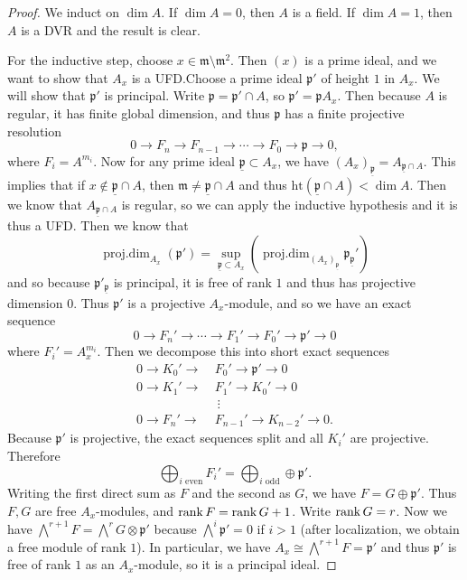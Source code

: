 \documentclass[leqno, openany]{memoir}
\theoremstyle{definition}
\theoremstyle{remark}
\theoremstyle{plain}
\theoremstyle{definition}
\theoremstyle{remark}
\newcommand{\mf}[1]{\mathfrak{#1}}
\newcommand{\mr}[1]{\mathrm{#1}}
\newcommand{\ul}[1]{\underline{#1}}
\DeclareMathOperator{\pdim}{proj.dim}
\begin{document}
\begin{proof} We induct on $\dim A$. If $\dim A = 0$, then $A$ is a field. If
    $\dim A = 1$, then $A$ is a DVR and the result is clear.

    For the inductive step, choose $x \in \mf{m} \setminus \mf{m}^2$. Then
    $(x)$ is a prime ideal, and we want to show that $A_x$ is a UFD.\@ Choose a
    prime ideal $\mf{p}'$ of height $1$ in $A_x$. We will show that $\mf{p}'$
    is principal. Write $\mf{p} = \mf{p}' \cap A$, so $\mf{p}' = \mf{p} A_x$.
    Then because $A$ is regular, it has finite global dimension, and thus
    $\mf{p}$ has a finite projective resolution \[ 0 \to F_n \to F_{n-1} \to
    \cdots \to F_0 \to \mf{p} \to 0, \] where $F_i = A^{m_i}$. Now for any
    prime ideal $\ul{\mf{p}} \subset A_x$, we have ${(A_x)}_{\ul{\mf{p}}} =
    A_{\ul{\mf{p}} \cap A}$. This implies that if $x \notin \ul{\mf{p}} \cap
    A$, then $\mf{m} \neq \ul{\mf{p}} \cap A$ and thus $\mr{ht}(\ul{\mf{p}}
    \cap A) < \dim A$. Then we know that $A_{\ul{\mf{p}} \cap A}$ is regular,
    so we can apply the inductive hypothesis and it is thus a UFD. Then we know
    that \[ \pdim_{A_x}(\mf{p}') = \sup_{\ul{\mf{p}} \subset A_x}
    (\pdim_{{(A_x)}_{\ul{\mf{p}}}} \mf{p}_{\ul{\mf{p}}}') \] and so because
    $\mf{p}'_{\ul{\mf{p}}}$ is principal, it is free of rank $1$ and thus has
    projective dimension $0$. Thus $\mf{p}'$ is a projective $A_x$-module, and
    so we have an exact sequence \[ 0 \to F_n' \to  \cdots \to F_1' \to F_0'
        \to \mf{p}' \to 0 \] where $F_i' = A_x^{m_i}$. Then we decompose this
        into short exact sequences \begin{align*} 0 \to K_0' \to &\ F_0' \to
            \mf{p}' \to 0 \\ 0 \to K_1' \to &\ F_1' \to K_0' \to 0 \\ &\ \
        \vdots \\ 0 \to F_n' \to &\ F_{n-1}' \to K_{n-2}' \to 0.  \end{align*}
        Because $\mf{p}'$ is projective, the exact sequences split and all
        $K_i'$ are projective. Therefore \[ \bigoplus_{i \text{ even}} F_i' =
        \bigoplus_{i \text{ odd}} \oplus \mf{p}'. \] Writing the first direct
        sum as $F$ and the second as $G$, we have $F = G \oplus \mf{p}'$. Thus
        $F,G$ are free $A_x$-modules, and $\rank F = \rank G + 1$. Write $\rank
        G = r$. Now we have $\bigwedge^{r+1} F = \bigwedge^r G \otimes \mf{p}'$
        because $\bigwedge^i \mf{p}' = 0$ if $i > 1$ (after localization, we
        obtain a free module of rank $1$). In particular, we have $A_x \cong
        \bigwedge^{r+1} F = \mf{p}'$ and thus $\mf{p}'$ is free of rank $1$ as
        an $A_x$-module, so it is a principal ideal.  \end{proof}
\end{document}
